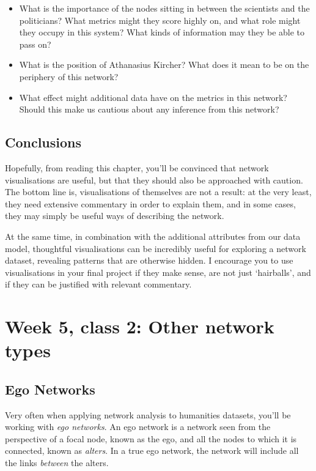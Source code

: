 \documentclass[
]{book}
\begin{document}
\begin{itemize}
\item
  What is the importance of the nodes sitting in between the scientists and the politicians? What metrics might they score highly on, and what role might they occupy in this system? What kinds of information may they be able to pass on?
\item
  What is the position of Athanasius Kircher? What does it mean to be on the periphery of this network?
\item
  What effect might additional data have on the metrics in this network? Should this make us cautious about any inference from this network?
\end{itemize}

\hypertarget{conclusions-1}{%
\section{Conclusions}\label{conclusions-1}}

Hopefully, from reading this chapter, you'll be convinced that network visualisations are useful, but that they should also be approached with caution. The bottom line is, visualisations of themselves are not a result: at the very least, they need extensive commentary in order to explain them, and in some cases, they may simply be useful ways of describing the network.

At the same time, in combination with the additional attributes from our data model, thoughtful visualisations can be incredibly useful for exploring a network dataset, revealing patterns that are otherwise hidden. I encourage you to use visualisations in your final project if they make sense, are not just `hairballs', and if they can be justified with relevant commentary.

\hypertarget{week-5-class-2-other-network-types}{%
\chapter{Week 5, class 2: Other network types}\label{week-5-class-2-other-network-types}}

\hypertarget{ego-networks}{%
\section{Ego Networks}\label{ego-networks}}

Very often when applying network analysis to humanities datasets, you'll be working with \emph{ego networks}. An ego network is a network seen from the perspective of a focal node, known as the ego, and all the nodes to which it is connected, known as \emph{alters}. In a true ego network, the network will include all the links \emph{between} the alters.
\end{document}
